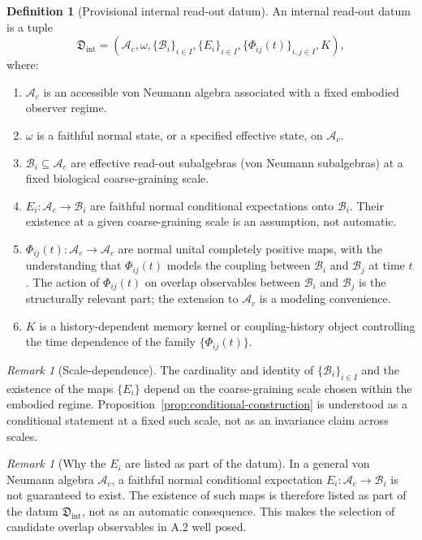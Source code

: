 \documentclass[12pt]{article}
\theoremstyle{definition}
\newtheorem{definition}[proposition]{Definition}
\theoremstyle{remark}
\newtheorem{remark}[proposition]{Remark}
\newcommand{\Ac}{\mathcal A_c}
\begin{document}
\begin{definition}[Provisional internal read-out datum]
An internal read-out datum is a tuple
\[
\mathfrak D_{\mathrm{int}}
=
(\Ac,\omega,\{\mathcal B_i\}_{i\in I},\{E_i\}_{i\in I},\{\Phi_{ij}(t)\}_{i,j\in I},K),
\]
where:
\begin{enumerate}[label=(\roman*)]
\item \(\Ac\) is an accessible von Neumann algebra associated with a
fixed embodied observer regime.
\item \(\omega\) is a faithful normal state, or a specified effective
state, on \(\Ac\).
\item \(\mathcal B_i\subseteq\Ac\) are effective read-out subalgebras
(von Neumann subalgebras) at a fixed biological coarse-graining scale.
\item \(E_i:\Ac\to\mathcal B_i\) are faithful normal conditional
expectations onto \(\mathcal B_i\). Their existence at a given
coarse-graining scale is an assumption, not automatic.
\item \(\Phi_{ij}(t):\Ac\to\Ac\) are normal unital completely positive
maps, with the understanding that \(\Phi_{ij}(t)\) models the coupling
between \(\mathcal B_i\) and \(\mathcal B_j\) at time \(t\). The action
of \(\Phi_{ij}(t)\) on overlap observables between \(\mathcal B_i\) and
\(\mathcal B_j\) is the structurally relevant part; the extension to
\(\Ac\) is a modeling convenience.
\item \(K\) is a history-dependent memory kernel or coupling-history
object controlling the time dependence of the family
\(\{\Phi_{ij}(t)\}\).
\end{enumerate}
\end{definition}

\begin{remark}[Scale-dependence]
The cardinality and identity of \(\{\mathcal B_i\}_{i\in I}\) and the
existence of the maps \(\{E_i\}\) depend on the coarse-graining scale
chosen within the embodied regime.
Proposition~\ref{prop:conditional-construction} is understood as a
conditional statement at a fixed such scale, not as an invariance claim
across scales.
\end{remark}

\begin{remark}[Why the \(E_i\) are listed as part of the datum]
In a general von Neumann algebra \(\Ac\), a faithful normal conditional
expectation \(E_i:\Ac\to\mathcal B_i\) is not guaranteed to exist. The
existence of such maps is therefore listed as part of the datum
\(\mathfrak D_{\mathrm{int}}\), not as an automatic consequence. This
makes the selection of candidate overlap observables in A.2 well
posed.
\end{remark}
\end{document}
